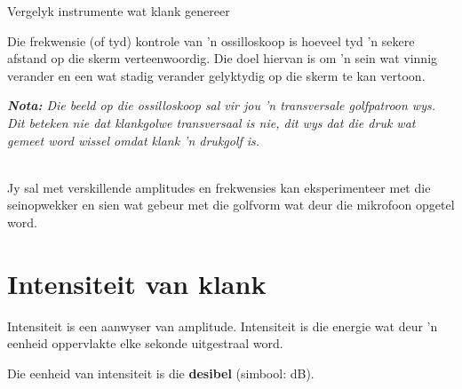 \begin{activity}{Vergelyk instrumente wat klank genereer}
\begin{minipage}{.5\textwidth}
 	
Die frekwensie (of tyd) kontrole van 'n ossilloskoop is hoeveel tyd 'n sekere afstand op die skerm verteenwoordig. Die doel hiervan is om 'n sein wat vinnig verander en een wat stadig verander gelyktydig op die skerm te kan vertoon.\\
\end{minipage}
\begin{minipage}{.5\textwidth}
\begin{center}
\begin{minipage}{.8\textwidth}
\vspace{.5cm}\textsl{\textbf{Nota:} Die beeld op die ossilloskoop sal vir jou 'n transversale golfpatroon wys. Dit beteken nie dat klankgolwe transversaal is nie, dit wys dat die druk wat gemeet word wissel omdat klank 'n drukgolf is.}
\end{minipage}
\end{center}
\end{minipage}
\vspace{1em}\\
Jy sal met verskillende amplitudes en frekwensies kan eksperimenteer met die seinopwekker en sien wat gebeur met die golfvorm wat deur die mikrofoon opgetel word.\\


\end{activity}



\section*{Intensiteit van klank}
\nopagebreak

\par
Intensiteit is een aanwyser van amplitude. Intensiteit is die energie wat deur 'n eenheid oppervlakte elke sekonde uitgestraal word.\par

Die eenheid van intensiteit is die \textbf{desibel} (simbool: dB).


